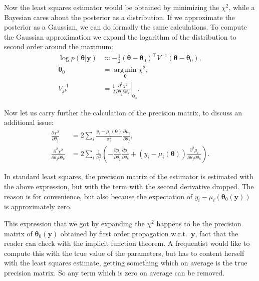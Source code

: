 Now the least squares estimator would be obtained by minimizing the $\chi^2$,
while a Bayesian cares about the posterior as a distribution. If we approximate
the posterior as a Gaussian, we can do formally the same calculations. To
compute the Gaussian approximation we expand the logarithm of the distribution
to second order around the maximum:
%
\begin{align}
    \log p(\boldsymbol\theta|\mathbf y) &\approx
    -\frac 12 (\boldsymbol\theta-\boldsymbol\theta_0)^\top
    V^{-1} (\boldsymbol\theta-\boldsymbol\theta_0), \\
    \boldsymbol\theta_0
    &= \operatorname*{arg\,min}_{\boldsymbol\theta} \chi^2, \\
    V^{-1}_{jk} &= \frac12 \left.
    \frac {\partial^2 \chi^2} {\partial\theta_j \partial\theta_k}
    \right|_{\boldsymbol\theta_0}. \label{eq:lsqpm}
\end{align}

Now let us carry further the calculation of the precision matrix, to discuss
an additional issue:
%
\begin{align}
    \frac{\partial\chi^2}{\partial\theta_j} &=
    2 \sum_i \frac {y_i - \mu_i(\boldsymbol\theta)} {\sigma_i^2}
    \frac {\partial\mu_i} {\partial\theta_j}, \\
    \frac {\partial^2 \chi^2} {\partial\theta_j \partial\theta_k} &=
    2 \sum_i \frac1{\sigma_i^2} \left(
    -\frac {\partial\mu_i} {\partial\theta_j}
    \frac {\partial\mu_i} {\partial\theta_k}
    + (y_i - \mu_i(\boldsymbol\theta))
    \frac {\partial^2 \mu_i} {\partial\theta_j \partial\theta_k}
    \right). \label{eq:lsqhess}
\end{align}

In standard least squares, the precision matrix of the estimator is estimated
with the above expression, but with the term with the second derivative
dropped. The reason is for convenience, but also because the expectation of
$y_i - \mu_i(\boldsymbol\theta_0(\mathbf y))$ is approximately zero.

This expression that we got by expanding the $\chi^2$ happens to be the
precision matrix of $\boldsymbol\theta_0(\mathbf y)$ obtained by first order
propagation w.r.t.~$\mathbf y$, fact that the reader can check with the
implicit function theorem. A frequentist would like to compute this with the
true value of the parameters, but has to content herself with the least squares
estimate, getting something which on average is the true precision matrix. So
any term which is zero on average can be removed.

